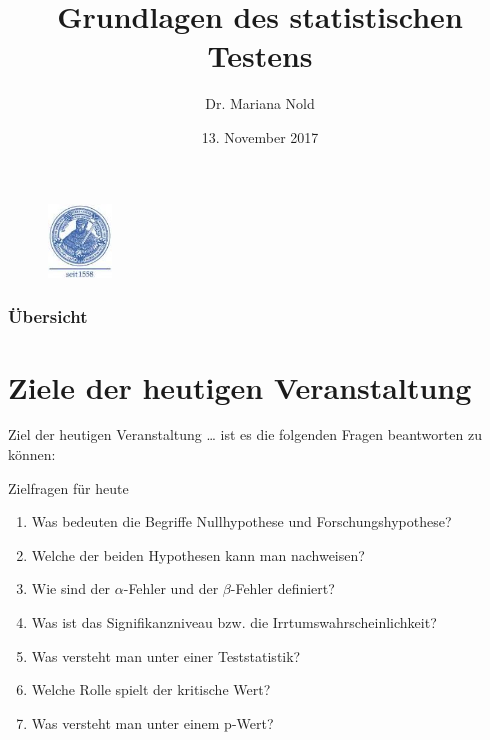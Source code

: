 \documentclass[usenames,dvipsnames,handout]{beamer}
\begin{document}
\author[Dr. Mariana Nold]{Dr. Mariana Nold}
 \date{}
\title [Grundlagen des statistischen Testens]{Grundlagen des statistischen Testens}
\date{13. November 2017}
\begin{frame}
\maketitle

  \begin{figure}[ht]
 	\centering
 	      \includegraphics[width=0.15\textwidth]{index.jpeg}
 	\end{figure}
\end{frame} 

\begin{frame}
  \frametitle{Übersicht}
  \tableofcontents
\end{frame}

\section{Ziele der heutigen Veranstaltung }
\begin{frame}{Ziel der heutigen Veranstaltung \dots}
ist es die folgenden Fragen beantworten zu können:
\begin{block}{Zielfragen für heute}
\begin{enumerate}
\item{Was bedeuten die Begriffe Nullhypothese und Forschungshypothese?}
\item{Welche der beiden Hypothesen kann man nachweisen?}
\item{Wie sind der $\alpha$-Fehler und der $\beta$-Fehler definiert?}
\item{Was ist das Signifikanzniveau bzw. die Irrtumswahrscheinlichkeit?}
\item{Was versteht man unter einer Teststatistik?}
\item{Welche Rolle spielt der kritische Wert?}
\item{Was versteht man unter einem p-Wert?}
\end{enumerate}
\end{block}
\end{frame}
\end{document}
